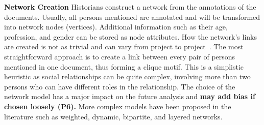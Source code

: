 \noindent\textbf{Network Creation}
Historians construct a network from the annotations of the documents. Usually, all persons mentioned are annotated and will be transformed into network nodes (vertices). Additional information such as their age, profession, and gender can be stored as node attributes.
How the network's links are created is not as trivial and can vary from project to project~\cite{alkadi2022}. The most straightforward approach is to create a link between every pair of persons mentioned in one document, thus forming a clique motif. This is a simplistic heuristic as social relationships can be quite complex, involving more than two persons who can have different roles in the relationship. The choice of the network model has a major impact on the future analysis and \textbf{may add bias if chosen loosely (P6).}
More complex models have been proposed in the literature such as weighted, dynamic, bipartite, and layered networks. %



